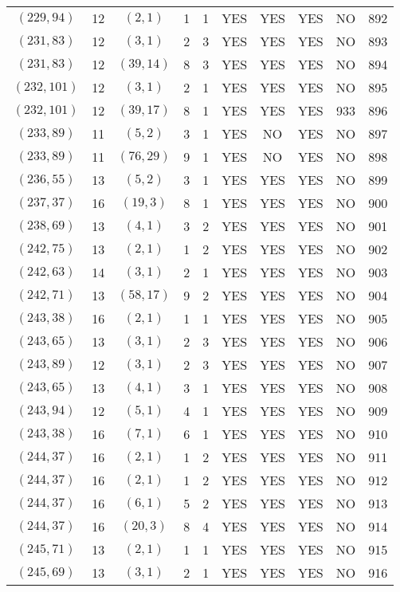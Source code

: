 \begin{longtable}{|c|c|c|c|c|c|c|c|c|c|}
$(229, 94)$ & 12 & $(2, 1)$ & 1 & 1 & YES & YES & YES & NO & 892\\
$(231, 83)$ & 12 & $(3, 1)$ & 2 & 3 & YES & YES & YES & NO & 893\\
$(231, 83)$ & 12 & $(39, 14)$ & 8 & 3 & YES & YES & YES & NO & 894\\
$(232, 101)$ & 12 & $(3, 1)$ & 2 & 1 & YES & YES & YES & NO & 895\\
$(232, 101)$ & 12 & $(39, 17)$ & 8 & 1 & YES & YES & YES & 933 & 896\\
$(233, 89)$ & 11 & $(5, 2)$ & 3 & 1 & YES & NO & YES & NO & 897\\
$(233, 89)$ & 11 & $(76, 29)$ & 9 & 1 & YES & NO & YES & NO & 898\\
$(236, 55)$ & 13 & $(5, 2)$ & 3 & 1 & YES & YES & YES & NO & 899\\
$(237, 37)$ & 16 & $(19, 3)$ & 8 & 1 & YES & YES & YES & NO & 900\\
$(238, 69)$ & 13 & $(4, 1)$ & 3 & 2 & YES & YES & YES & NO & 901\\
$(242, 75)$ & 13 & $(2, 1)$ & 1 & 2 & YES & YES & YES & NO & 902\\
$(242, 63)$ & 14 & $(3, 1)$ & 2 & 1 & YES & YES & YES & NO & 903\\
$(242, 71)$ & 13 & $(58, 17)$ & 9 & 2 & YES & YES & YES & NO & 904\\
$(243, 38)$ & 16 & $(2, 1)$ & 1 & 1 & YES & YES & YES & NO & 905\\
$(243, 65)$ & 13 & $(3, 1)$ & 2 & 3 & YES & YES & YES & NO & 906\\
$(243, 89)$ & 12 & $(3, 1)$ & 2 & 3 & YES & YES & YES & NO & 907\\
$(243, 65)$ & 13 & $(4, 1)$ & 3 & 1 & YES & YES & YES & NO & 908\\
$(243, 94)$ & 12 & $(5, 1)$ & 4 & 1 & YES & YES & YES & NO & 909\\
$(243, 38)$ & 16 & $(7, 1)$ & 6 & 1 & YES & YES & YES & NO & 910\\
$(244, 37)$ & 16 & $(2, 1)$ & 1 & 2 & YES & YES & YES & NO & 911\\
$(244, 37)$ & 16 & $(2, 1)$ & 1 & 2 & YES & YES & YES & NO & 912\\
$(244, 37)$ & 16 & $(6, 1)$ & 5 & 2 & YES & YES & YES & NO & 913\\
$(244, 37)$ & 16 & $(20, 3)$ & 8 & 4 & YES & YES & YES & NO & 914\\
$(245, 71)$ & 13 & $(2, 1)$ & 1 & 1 & YES & YES & YES & NO & 915\\
$(245, 69)$ & 13 & $(3, 1)$ & 2 & 1 & YES & YES & YES & NO & 916\\

\end{longtable}
